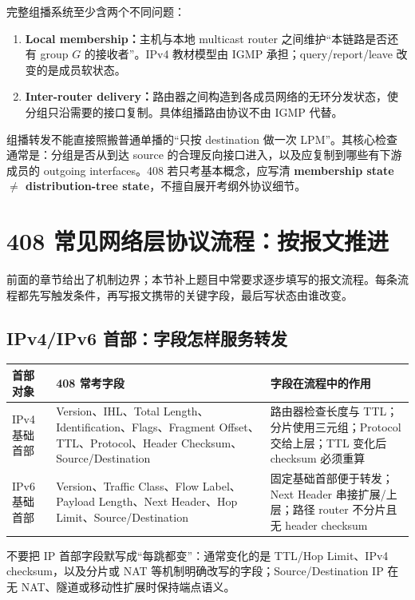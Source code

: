 \documentclass[11pt,a4paper]{ctexart}
\newcommand{\kw}[1]{\textbf{\color{deep}#1}}
\begin{document}
完整组播系统至少含两个不同问题：
\begin{enumerate}
  \item \kw{Local membership：}主机与本地 multicast router 之间维护“本链路是否还有 group $G$ 的接收者”。IPv4 教材模型由 IGMP 承担；query/report/leave 改变的是成员软状态。
  \item \kw{Inter-router delivery：}路由器之间构造到各成员网络的无环分发状态，使分组只沿需要的接口复制。具体组播路由协议不由 IGMP 代替。
\end{enumerate}

组播转发不能直接照搬普通单播的“只按 destination 做一次 LPM”。其核心检查通常是：分组是否从到达 source 的合理反向接口进入，以及应复制到哪些有下游成员的 outgoing interfaces。408 若只考基本概念，应写清 \textbf{membership state $\neq$ distribution-tree state}，不擅自展开考纲外协议细节。

\section{408 常见网络层协议流程：按报文推进}

前面的章节给出了机制边界；本节补上题目中常要求逐步填写的报文流程。每条流程都先写触发条件，再写报文携带的关键字段，最后写状态由谁改变。

\subsection{IPv4/IPv6 首部：字段怎样服务转发}

\begin{center}\small
\begin{tabularx}{\linewidth}{L{2.3cm}Y Y}
\toprule
首部对象 & 408 常考字段 & 字段在流程中的作用\\
\midrule
IPv4 基础首部 & Version、IHL、Total Length、Identification、Flags、Fragment Offset、TTL、Protocol、Header Checksum、Source/Destination & 路由器检查长度与 TTL；分片使用三元组；Protocol 交给上层；TTL 变化后 checksum 必须重算\\
IPv6 基础首部 & Version、Traffic Class、Flow Label、Payload Length、Next Header、Hop Limit、Source/Destination & 固定基础首部便于转发；Next Header 串接扩展/上层；路径 router 不分片且无 header checksum\\
\bottomrule
\end{tabularx}\end{center}

不要把 IP 首部字段默写成“每跳都变”：通常变化的是 TTL/Hop Limit、IPv4 checksum，以及分片或 NAT 等机制明确改写的字段；Source/Destination IP 在无 NAT、隧道或移动性扩展时保持端点语义。
\end{document}
